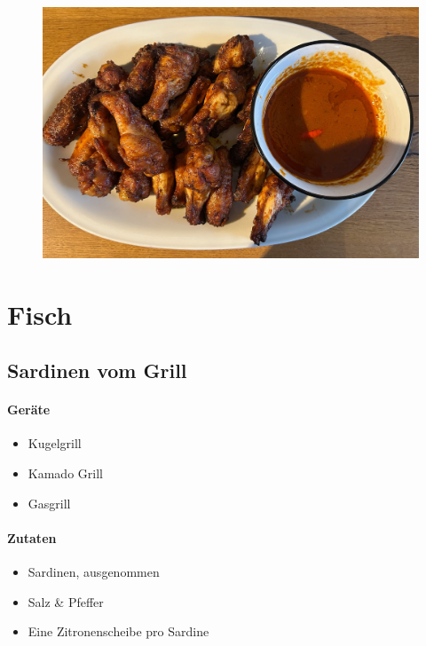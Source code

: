 \begin{figure}[htbp]
	\centering
	\begin{minipage}{1\textwidth}
		\centering
		\includegraphics[width=.9\linewidth]{pics/Buffalo_Wings}
		\label{fig:BuffaloWings}
	\end{minipage}
\end{figure}
\newpage



\section{Fisch}

\subsection{Sardinen vom Grill}

\paragraph{Geräte}

\begin{itemize}[noitemsep]
	\item Kugelgrill
	\item Kamado Grill
	\item Gasgrill
\end{itemize}

\paragraph{Zutaten}

\begin{itemize}[noitemsep]
	\item Sardinen, ausgenommen
	\item Salz \& Pfeffer
	\item Eine Zitronenscheibe pro Sardine
\end{itemize}


